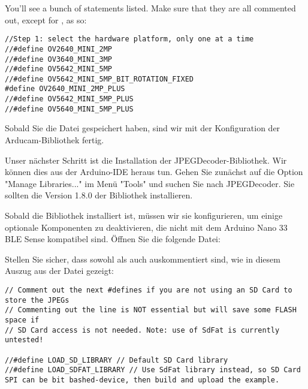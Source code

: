
You'll see a bunch of  statements listed. Make sure that they are all commented out, except for , as so:

\begin{code}
    \begin{lstlisting}
//Step 1: select the hardware platform, only one at a time
//#define OV2640_MINI_2MP
//#define OV3640_MINI_3MP
//#define OV5642_MINI_5MP
//#define OV5642_MINI_5MP_BIT_ROTATION_FIXED
#define OV2640_MINI_2MP_PLUS
//#define OV5642_MINI_5MP_PLUS
//#define OV5640_MINI_5MP_PLUS
  \end{lstlisting}
\end{code}

Sobald Sie die Datei gespeichert haben, sind wir mit der Konfiguration der Arducam-Bibliothek fertig.

Unser nächster Schritt ist die Installation der JPEGDecoder-Bibliothek. Wir können dies aus der Arduino-IDE heraus tun. Gehen Sie zunächst auf die Option "Manage Libraries..." im Menü "Tools" und suchen Sie nach JPEGDecoder. Sie sollten die Version 1.8.0 der Bibliothek installieren.

Sobald die Bibliothek installiert ist, müssen wir sie konfigurieren, um einige optionale Komponenten zu deaktivieren, die nicht mit dem Arduino Nano 33 BLE Sense kompatibel sind. Öffnen Sie die folgende Datei:


Stellen Sie sicher, dass sowohl  als auch  auskommentiert sind, wie in diesem Auszug aus der Datei gezeigt:


\begin{code}
    \begin{lstlisting}
// Comment out the next #defines if you are not using an SD Card to store the JPEGs
// Commenting out the line is NOT essential but will save some FLASH space if
// SD Card access is not needed. Note: use of SdFat is currently untested!

//#define LOAD_SD_LIBRARY // Default SD Card library
//#define LOAD_SDFAT_LIBRARY // Use SdFat library instead, so SD Card SPI can be bit bashed-device, then build and upload the example.
  \end{lstlisting}
\end{code}



